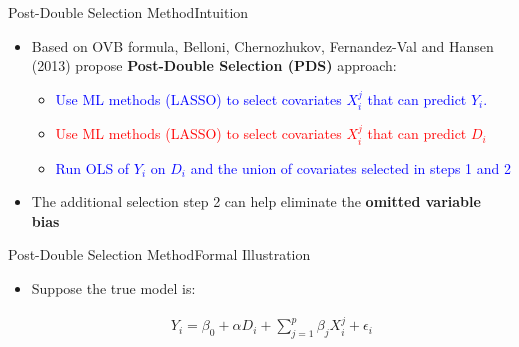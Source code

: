 \documentclass[dvipsnames,hyperref={pdfpagelabels=false}]{beamer}
\begin{document}
\begin{frame}{Post-Double Selection Method}{Intuition}
	
	\begin{itemize}
		
	
		\item Based on OVB formula, Belloni, Chernozhukov, Fernandez-Val and Hansen (2013) propose \textbf{Post-Double Selection (PDS)} approach: 
		\begin{itemize}
			\vspace{0.2cm}
			\item[1] \textcolor{blue}{Use ML methods (LASSO) to select covariates $X^{j}_{i}$ that can predict $Y_{i}$.}
			\vspace{0.2cm}
			\item[2] \textcolor{red}{Use ML methods (LASSO) to select covariates $X^{j}_{i}$ that can predict $D_{i}$}
			\vspace{0.2cm}
			\item[3] \textcolor{blue}{Run OLS of $Y_{i}$ on $D_{i}$ and the union of covariates selected in steps 1 and 2}
		\end{itemize}
		\item The additional selection step 2 can help eliminate the \textbf{omitted variable bias}
	\end{itemize}
\end{frame}




\begin{frame}{Post-Double Selection Method}{Formal Illustration}

\begin{itemize}
	\item Suppose the true model is:
	
	\begin{eqnarray*}
	Y_{i} = \beta_{0} + \alpha D_{i} + \sum^{p}_{j=1} \beta_{j} X^{j}_{i}  + \epsilon_{i}
\end{eqnarray*}	
	


	
\end{itemize}

\end{frame}
\end{document}
